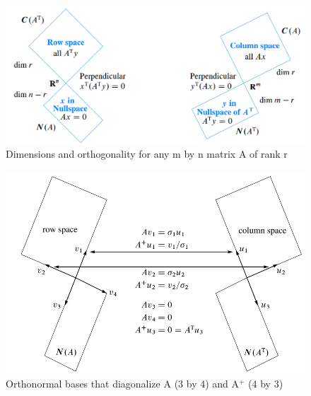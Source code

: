 \documentclass[10.5pt]{article}
\begin{document}
\begin{figure}[H]
\centering
\includegraphics[scale=0.6]{1.PNG}
\caption{Dimensions and orthogonality for any m by n matrix A of rank r}
\end{figure}

\begin{figure}[H]
\centering
\includegraphics[scale=0.7]{2.PNG}
\caption{Orthonormal bases that diagonalize A (3 by 4) and A$^+$ (4 by 3)}
\end{figure}
\pagebreak
\end{document}
